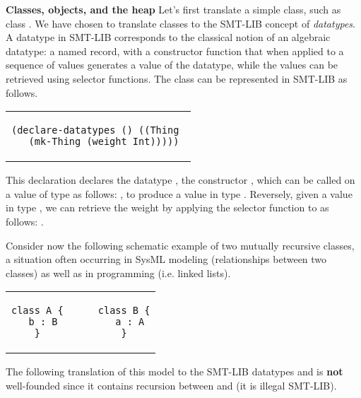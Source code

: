 \textbf{Classes, objects, and the heap} Let's first translate a simple
class, such as class .  We have chosen to translate
classes to the SMT-LIB concept of {\em datatypes}. A datatype in
SMT-LIB corresponds to the classical notion of an algebraic datatype:
a named record, with a constructor function that when applied to a
sequence of values generates a value of the datatype, while the values
can be retrieved using selector functions.  The class 
can be represented in SMT-LIB as follows.

\lstset{language=SMT,numbers=none}

\begin{center}
\begin{tabular}{c}
\begin{lstlisting}
(declare-datatypes () ((Thing 
  (mk-Thing (weight Int)))))
\end{lstlisting}
\end{tabular}
\end{center}

\noindent This declaration declares the datatype , the
constructor , which can be called on a value 
of type  as follows: , to produce a
value in type . Reversely, given a value  in type
, we can retrieve the weight by applying the selector
function  to  as follows: .

Consider now the following schematic example of two mutually recursive
classes, a situation often occurring in SysML modeling (relationships
between two classes) as well as in programming (i.e. linked lists).

\lstset{language=K,numbers=none}

\begin{center}
\begin{tabular}{c}
\begin{lstlisting}
class A {      class B {
  b : B          a : A
}              }
\end{lstlisting}
\end{tabular}
\end{center}

\noindent The following translation of this model to the SMT-LIB datatypes
 and  is {\bf not} well-founded since it contains
recursion between  and  (it is illegal SMT-LIB).

\lstset{language=SMT,numbers=none}


